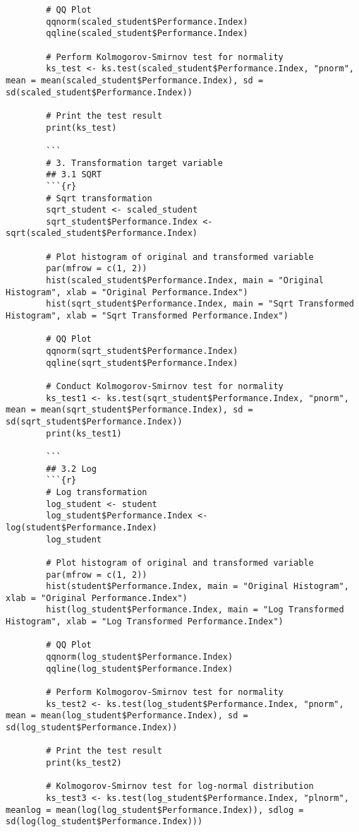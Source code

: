 \documentclass[12pt]{article}
\begin{document}
\begin{lstlisting}
		# QQ Plot
		qqnorm(scaled_student$Performance.Index)
		qqline(scaled_student$Performance.Index)
		
		# Perform Kolmogorov-Smirnov test for normality
		ks_test <- ks.test(scaled_student$Performance.Index, "pnorm", mean = mean(scaled_student$Performance.Index), sd = sd(scaled_student$Performance.Index))
		
		# Print the test result
		print(ks_test)
		
		```
		# 3. Transformation target variable
		## 3.1 SQRT
		```{r}
		# Sqrt transformation
		sqrt_student <- scaled_student
		sqrt_student$Performance.Index <- sqrt(scaled_student$Performance.Index)
		
		# Plot histogram of original and transformed variable
		par(mfrow = c(1, 2))
		hist(scaled_student$Performance.Index, main = "Original Histogram", xlab = "Original Performance.Index")
		hist(sqrt_student$Performance.Index, main = "Sqrt Transformed Histogram", xlab = "Sqrt Transformed Performance.Index")
		
		# QQ Plot
		qqnorm(sqrt_student$Performance.Index)
		qqline(sqrt_student$Performance.Index)
		
		# Conduct Kolmogorov-Smirnov test for normality
		ks_test1 <- ks.test(sqrt_student$Performance.Index, "pnorm", mean = mean(sqrt_student$Performance.Index), sd = sd(sqrt_student$Performance.Index))
		print(ks_test1)
		
		```
		## 3.2 Log
		```{r}
		# Log transformation
		log_student <- student
		log_student$Performance.Index <- log(student$Performance.Index)
		log_student
		
		# Plot histogram of original and transformed variable
		par(mfrow = c(1, 2))
		hist(student$Performance.Index, main = "Original Histogram", xlab = "Original Performance.Index")
		hist(log_student$Performance.Index, main = "Log Transformed Histogram", xlab = "Log Transformed Performance.Index")
		
		# QQ Plot
		qqnorm(log_student$Performance.Index)
		qqline(log_student$Performance.Index)
		
		# Perform Kolmogorov-Smirnov test for normality
		ks_test2 <- ks.test(log_student$Performance.Index, "pnorm", mean = mean(log_student$Performance.Index), sd = sd(log_student$Performance.Index))
		
		# Print the test result
		print(ks_test2)
		
		# Kolmogorov-Smirnov test for log-normal distribution
		ks_test3 <- ks.test(log_student$Performance.Index, "plnorm", meanlog = mean(log(log_student$Performance.Index)), sdlog = sd(log(log_student$Performance.Index)))
		

\end{lstlisting}
\end{document}
